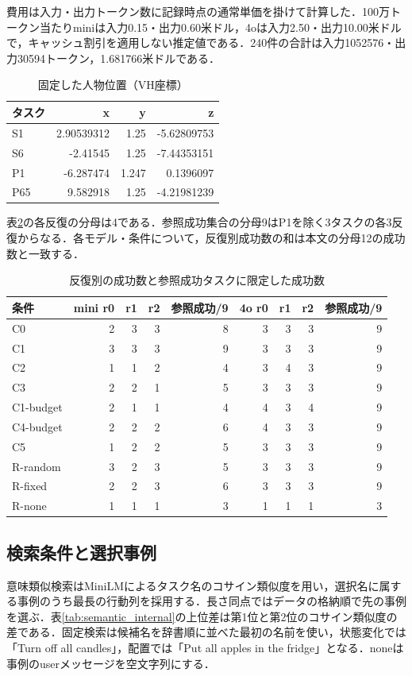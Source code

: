 費用は入力・出力トークン数に記録時点の通常単価を掛けて計算した．100万トークン当たりminiは入力0.15・出力0.60米ドル，4oは入力2.50・出力10.00米ドルで，キャッシュ割引を適用しない推定値である．240件の合計は入力1052576・出力30594トークン，1.681766米ドルである．
\begin{table}[tb]
\caption{固定した人物位置（VH座標）}\label{tab:fixed_positions_internal}
\centering\small
\setlength{\tabcolsep}{3pt}
\begin{tabular}{lrrr}
\hline
タスク & x & y & z \\
\hline
S1 & 2.90539312 & 1.25 & -5.62809753 \\
S6 & -2.41545 & 1.25 & -7.44353151 \\
P1 & -6.287474 & 1.247 & 0.1396097 \\
P65 & 9.582918 & 1.25 & -4.21981239 \\
\hline
\end{tabular}
\end{table}

表\ref{tab:repeat_internal}の各反復の分母は4である．参照成功集合の分母9はP1を除く3タスクの各3反復からなる．各モデル・条件について，反復別成功数の和は本文の分母12の成功数と一致する．
\begin{table}[tb]
\caption{反復別の成功数と参照成功タスクに限定した成功数}\label{tab:repeat_internal}
\centering\small
\setlength{\tabcolsep}{3pt}
\begin{tabular}{lrrrrrrrr}
\hline
条件 & mini r0 & r1 & r2 & 参照成功/9 & 4o r0 & r1 & r2 & 参照成功/9 \\
\hline
C0 & 2 & 3 & 3 & 8 & 3 & 3 & 3 & 9 \\
C1 & 3 & 3 & 3 & 9 & 3 & 3 & 3 & 9 \\
C2 & 1 & 1 & 2 & 4 & 3 & 4 & 3 & 9 \\
C3 & 2 & 2 & 1 & 5 & 3 & 3 & 3 & 9 \\
C1-budget & 2 & 1 & 1 & 4 & 4 & 3 & 4 & 9 \\
C4-budget & 2 & 2 & 2 & 6 & 4 & 3 & 3 & 9 \\
C5 & 1 & 2 & 2 & 5 & 3 & 3 & 3 & 9 \\
R-random & 3 & 2 & 3 & 5 & 3 & 3 & 3 & 9 \\
R-fixed & 2 & 2 & 3 & 6 & 3 & 3 & 3 & 9 \\
R-none & 1 & 1 & 1 & 3 & 1 & 1 & 1 & 3 \\
\hline
\end{tabular}
\end{table}

\subsection{検索条件と選択事例}\label{app:retrieval_conditions}
意味類似検索はMiniLMによるタスク名のコサイン類似度を用い，選択名に属する事例のうち最長の行動列を採用する．長さ同点ではデータの格納順で先の事例を選ぶ．表\ref{tab:semantic_internal}の上位差は第1位と第2位のコサイン類似度の差である．固定検索は候補名を辞書順に並べた最初の名前を使い，状態変化では「Turn off all candles」，配置では「Put all apples in the fridge」となる．noneは事例のuserメッセージを空文字列にする．

